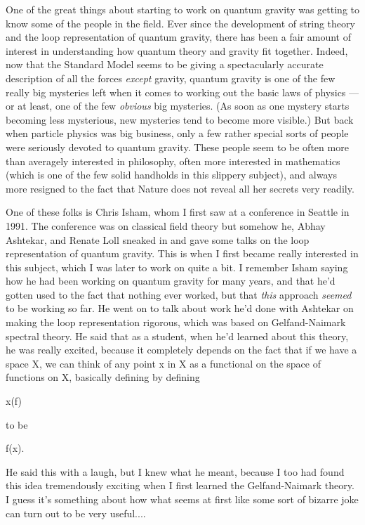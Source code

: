 



One of the great things about starting to work on quantum gravity was
getting to know some of the people in the field.  Ever since the
development of string theory and the loop representation of quantum
gravity, there has been a fair amount of interest in understanding how
quantum theory and gravity fit together.  Indeed, now that the Standard
Model seems to be giving a spectacularly accurate description of all the
forces \emph{except} gravity, quantum gravity is one of the few really big
mysteries left when it comes to working out the basic laws of physics
--- or at least, one of the few \emph{obvious} big mysteries.  (As soon as
one mystery starts becoming less mysterious, new mysteries tend to
become more visible.)  But back when particle physics was big business,
only a few rather special sorts of people were seriously devoted to
quantum gravity.  These people seem to be often more than averagely
interested in philosophy, often more interested in mathematics (which is
one of the few solid handholds in this slippery subject), and always
more resigned to the fact that Nature does not reveal all her secrets
very readily.

One of these folks is Chris Isham, whom I first saw at a conference in
Seattle in 1991.  The conference was on classical field theory but
somehow he, Abhay Ashtekar, and Renate Loll sneaked in and gave some
talks on the loop representation of quantum gravity.  This is when I
first became really interested in this subject, which I was later to
work on quite a bit.  I remember Isham saying how he had been working on
quantum gravity for many years, and that he'd gotten used to the fact that
nothing ever worked, but that \emph{this} approach \emph{seemed} to be working so
far.  He went on to talk about work he'd done with Ashtekar on making
the loop representation rigorous, which was based on Gelfand-Naimark
spectral theory.  He said that as a student, when he'd learned about
this theory, he was really excited, because it completely depends on the
fact that if we have a space X, we can think of any point x in X as a
functional on the space of functions on X, basically defining by
defining

x(f) 

to be

f(x).  

He said this with a laugh, but I knew what he meant, because I too had
found this idea tremendously exciting when I first learned the
Gelfand-Naimark theory.  I guess it's something about how what seems
at first like some sort of bizarre joke can turn out to be very useful....

